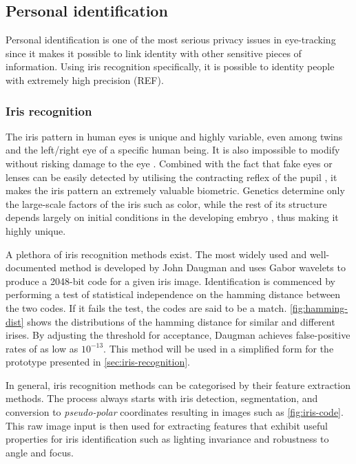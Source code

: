 \subsection{Personal identification}
Personal identification is one of the most serious privacy issues in eye-tracking since it makes it possible to link identity with other sensitive pieces of information. Using iris recognition specifically, it is possible to identity people with extremely high precision (REF). 

\subsubsection{Iris recognition}
The iris pattern in human eyes is unique and highly variable, even among twins and the left/right eye of a specific human being. It is also impossible to modify without risking damage to the eye \parencite{DAUGMAN_IRIS_ORIG}. Combined with the fact that fake eyes or lenses can be easily detected by utilising the contracting reflex of the pupil \parencite{DAUGMAN_IRIS_ORIG}, it makes the iris pattern an extremely valuable biometric. Genetics determine only the large-scale factors of the iris such as color, while the rest of its structure depends largely on initial conditions in the developing embryo \cite{kronfeldCHAPTERGrossAnatomy1962}, thus making it highly unique. 

A plethora of iris recognition methods exist. The most widely used and well-documented method is developed by John Daugman and uses Gabor wavelets \cite{daugmanHighConfidenceVisual1993} to produce a 2048-bit code for a given iris image. Identification is commenced by performing a test of statistical independence on the hamming distance between the two codes. If it fails the test, the codes are said to be a match. \autoref{fig:hamming-dist} shows the distributions of the hamming distance for similar and different irises. By adjusting the threshold for acceptance, Daugman achieves false-positive rates of as low as $10^{-13}$. This method will be used in a simplified form for the prototype presented in \autoref{sec:iris-recognition}.



In general, iris recognition methods can be categorised by their feature extraction methods. The process always starts with iris detection, segmentation, and conversion to \emph{pseudo-polar} coordinates resulting in images such as \autoref{fig:iris-code}. This raw image input is then used for extracting features that exhibit useful properties for iris identification such as lighting invariance and robustness to angle and focus.


